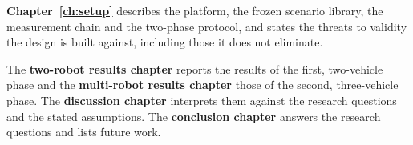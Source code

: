 \textbf{Chapter~\ref{ch:setup}} describes the platform, the frozen scenario library, the
measurement chain and the two-phase protocol, and states the threats to validity the design is built against, including those it does not eliminate.

The \textbf{two-robot results chapter} reports the results of the first, two-vehicle phase and the
\textbf{multi-robot results chapter} those of the second, three-vehicle phase.
The \textbf{discussion chapter} interprets them against
the research questions and the stated assumptions. The \textbf{conclusion chapter} answers the
research questions and lists future work.
